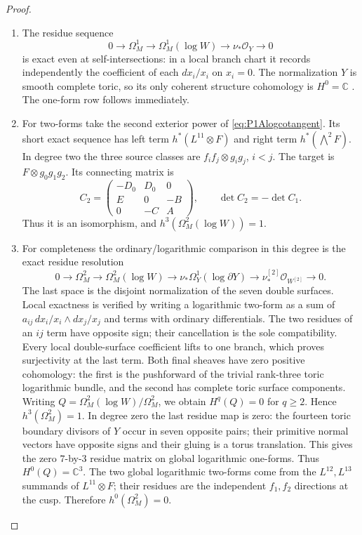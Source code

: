\begin{proof}
\begin{enumerate}[label=\arabic*.]
\item The residue sequence
\[
0\to\Omega_M^1\to\Omega_M^1(\log W)\to\nu_*\mathcal O_Y\to0
\]
is exact even at self-intersections: in a local branch chart it
records independently the coefficient of each $dx_i/x_i$ on
$x_i=0$. The normalization $Y$ is smooth complete toric, so its
only coherent structure cohomology is $H^0=\mathbb C$ \cite[Theorem 9.2.3, p.~410]{CoxLittleSchenck2011}.
The one-form row follows immediately.

\item For two-forms take the second exterior power of
\eqref{eq:P1Alogcotangent}. Its short exact sequence has left
term $h^*(L^{11}\otimes F)$ and right term
$h^*(\bigwedge^2F)$. In degree two the three source classes
are $f_if_j\otimes g_ig_j$, $i<j$. The target is
$F\otimes g_0g_1g_2$. Its connecting matrix is
\[
C_2=\begin{pmatrix}-D_0&D_0&0\\E&0&-B\\0&-C&A\end{pmatrix},
\qquad \det C_2=-\det C_1.
\]
Thus it is an isomorphism, and
$h^3(\Omega_M^2(\log W))=1$.

\item For completeness the ordinary/logarithmic comparison in this
degree is the exact residue resolution
\[
0\to\Omega_M^2\to\Omega_M^2(\log W)
 \to\nu_*\Omega_Y^1(\log\partial Y)
 \to\nu^{[2]}_*\mathcal O_{W^{[2]}}\to0.
\]
The last space is the disjoint normalization of the seven
double surfaces. Local exactness is verified by writing a
logarithmic two-form as a sum of
$a_{ij}\,dx_i/x_i\wedge dx_j/x_j$ and terms with ordinary
differentials. The two residues of an $ij$ term have opposite
sign; their cancellation is the sole compatibility. Every local
double-surface coefficient lifts to one branch, which proves
surjectivity at the last term.
Both final sheaves have zero positive cohomology: the first
is the pushforward of the trivial rank-three toric logarithmic
bundle, and the second has complete toric surface components.
Writing $Q=\Omega_M^2(\log W)/\Omega_M^2$, we obtain
$H^q(Q)=0$ for $q\ge2$. Hence
$h^3(\Omega_M^2)=1$.
In degree zero the last residue map is zero: the fourteen toric
boundary divisors of $Y$ occur in seven opposite pairs; their
primitive normal vectors have opposite signs and their gluing
is a torus translation. This gives the zero $7$-by-$3$ residue
matrix on global logarithmic one-forms. Thus $H^0(Q)=\mathbb C^3$.
The two global logarithmic two-forms come from the
$L^{12},L^{13}$ summands of $L^{11}\otimes F$; their residues
are the independent $f_1,f_2$ directions at the cusp.
Therefore $h^0(\Omega_M^2)=0$.


\end{enumerate}
\end{proof}
